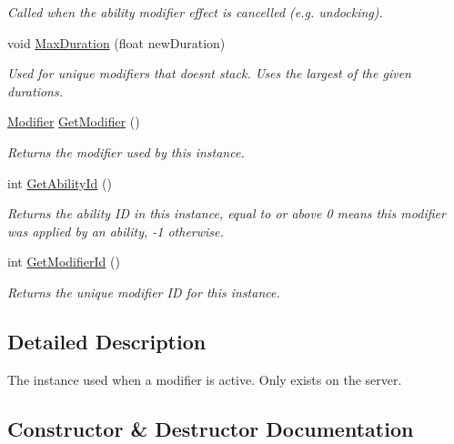 \begin{DoxyCompactItemize}
\begin{DoxyCompactList}\small\item\em Called when the ability modifier effect is cancelled (e.\+g. undocking). \end{DoxyCompactList}\item 
void \hyperlink{class_modifier_instance_server_abfb9cfedabb0659f8fb9c47a23fba19c}{Max\+Duration} (float new\+Duration)
\begin{DoxyCompactList}\small\item\em Used for unique modifiers that doesn\textquotesingle{}t stack. Uses the largest of the given durations. \end{DoxyCompactList}\item 
\hyperlink{class_modifier}{Modifier} \hyperlink{class_modifier_instance_server_a60d143f26963aec0a777ec248de46d99}{Get\+Modifier} ()
\begin{DoxyCompactList}\small\item\em Returns the modifier used by this instance. \end{DoxyCompactList}\item 
int \hyperlink{class_modifier_instance_server_a7ee38df01e1b762680b7e07379cfe14f}{Get\+Ability\+Id} ()
\begin{DoxyCompactList}\small\item\em Returns the ability ID in this instance, equal to or above 0 means this modifier was applied by an ability, -\/1 otherwise. \end{DoxyCompactList}\item 
int \hyperlink{class_modifier_instance_server_aac2b7d540a4a053d8b76f85b4e626a7e}{Get\+Modifier\+Id} ()
\begin{DoxyCompactList}\small\item\em Returns the unique modifier ID for this instance. \end{DoxyCompactList}\end{DoxyCompactItemize}


\subsection{Detailed Description}
The instance used when a modifier is active. Only exists on the server. 



\subsection{Constructor \& Destructor Documentation}
\hypertarget{class_modifier_instance_server_aac7cc3c3b5356e69334ba23463f80003}{}\label{class_modifier_instance_server_aac7cc3c3b5356e69334ba23463f80003} 
